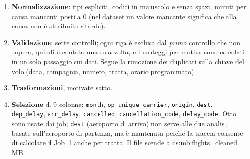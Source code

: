 \documentclass[11pt,a4paper]{article}
\newcommand{\DS}[2]{\csname ds:#1:#2\endcsname}
\newcommand{\code}[1]{\texttt{#1}}
\begin{document}
\begin{enumerate}
  \item \textbf{Normalizzazione}: tipi espliciti, codici in maiuscolo e senza spazi, minuti per causa mancanti posti a 0
        (nel dataset un valore mancante significa che alla causa non è attribuito ritardo).
  \item \textbf{Validazione}: sette controlli; ogni riga è esclusa dal \emph{primo} controllo che non supera, quindi è
        contata una sola volta, e i conteggi per motivo sono calcolati in un solo passaggio sui dati. Segue la
        rimozione dei duplicati sulla chiave del volo (data, compagnia, numero, tratta, orario programmato).
  \item \textbf{Trasformazioni}, motivate sotto.
  \item \textbf{Selezione} di 9 colonne: \code{month}, \code{op\_unique\_carrier}, \code{origin},
        \code{dest}, \code{dep\_delay}, \code{arr\_delay}, \code{cancelled}, \code{cancellation\_code},
        \code{delay\_code}. Otto sono usate dai job; \code{dest} (aeroporto di arrivo) non serve alle due analisi,
        basate sull'aeroporto di partenza, ma è mantenuta perché la traccia consente di calcolare il Job~1 anche
        per tratta. Il file scende a \DS{mb}{flights_cleaned}\,MB.
\end{enumerate}

\begin{table}[H]
\centering\scriptsize

\caption{Passi di validazione e trasformazione nell'ordine di applicazione, con le righe escluse o modificate.}
\label{tab:qualita}
\end{table}
\end{document}
